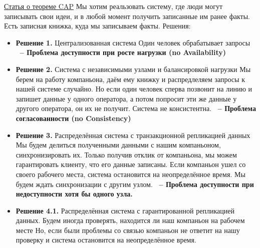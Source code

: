 \documentclass{article}
\begin{document}
\href{http://ksat.me/a-plain-english-introduction-to-cap-theorem}{Статья о теореме CAP}
\newline
\newline Мы хотим реальзовать систему, где люди могут записывать свои идеи, и в любой момент получить записанные им ранее факты.
\newline Есть записная книжка, куда мы записываем факты.
\newline Решения:
\begin{itemize}
    \item \textbf{Решение 1.} Централизованная система
    \newline Один человек обрабатывает запросы
    \color{red}
    \newline \textbf{~-- Проблема доступности при росте нагрузки (no Availability)}
    \color{black}
    \item \textbf{Решение 2.} Система с независимыми узлами и балансировкой нагрузки
    \newline Мы берем на работу компаньона, даём ему книжку и распредлеляем запросы к нашей системе случайно.
    \newline Но если один человек сперва позвонит на линию и запишет данные у одного оператора, а потом попросит эти же данные у другого оператора, он их не получит. Система не консистентна. 
    \color{red}
    \newline \textbf{~-- Проблема согласованности (no Consistency)}
    \color{black}
    \newpage
    \item \textbf{Решение 3.} Распределённая система с транзакционной репликацией данных
    \newline Мы будем делиться полученными данными с нашим компаньоном, синхронизировать их. Только получив отклик от компаньона, мы можем гарантировать клиенту, что его данные записаны.
    \newline Если компаньон ушел со своего рабочего места, система остановится на неопределённое время. Мы будем ждать синхронизации с другим узлом.
    \newline
    \color{red}
    \textbf{~-- Проблема доступности при недоступности хотя бы одного узла.}
    \color{black}
    \item \textbf{Решение 4.1.} Распределённая система с гарантированной репликацией данных.
    \newline Будем иногда проверять, находится ли наш компаньон на рабочем месте
    \newline Но, если были проблемы со связью компаньон не ответит на нашу проверку и система остановится на неопределённое время.

\end{itemize}
\end{document}
